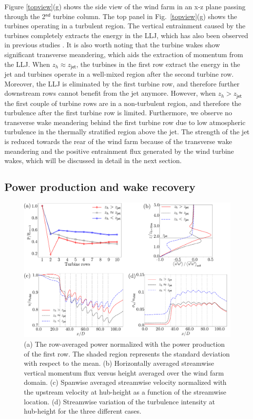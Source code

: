 \documentclass[%
 aip,
 amsmath,amssymb,
preprint,%
author-numerical,%
]{revtex4-1}
\begin{document}
Figure \ref{topview}(g) shows the side view of the wind farm in an x-z plane passing through the 2$^\mathsf{nd}$ turbine column. The top panel in Fig.\ \ref{topview}(g) shows the turbines operating in a turbulent region. The vertical entrainment caused by the turbines completely extracts the energy in the LLJ, which has also been observed in previous studies \cite{na18, lu11}. It is also worth noting that the turbine wakes show significant transverse meandering, which aids the extraction of momentum from the LLJ. When $z_h \approx z_\mathsf{jet}$, the turbines in the first row extract the energy in the jet and turbines operate in a well-mixed region after the second turbine row. Moreover, the LLJ is eliminated by the first turbine row, and therefore further downstream rows cannot benefit from the jet anymore. However, when $z_h > z_\mathsf{jet}$ the first couple of turbine rows are in a non-turbulent region, and therefore the turbulence after the first turbine row is limited. Furthermore, we observe no transverse wake meandering behind the first turbine row due to low atmospheric turbulence in the thermally stratified region above the jet. The strength of the jet is reduced towards the rear of the wind farm because of the transverse wake meandering and the positive entrainment flux generated by the wind turbine wakes, which will be discussed in detail in the next section.

\subsection{Power production and wake recovery}\label{sec3.2}
\begin{figure}
 \centering
 \includegraphics[width=0.9\linewidth]{powerplot} 
 \vspace{-0.25cm}
 \caption{(a) The row-averaged power normalized with the power production of the first row. The shaded region represents the standard deviation with respect to the mean. (b) Horizontally averaged streamwise vertical momentum flux versus height averaged over the wind farm domain. (c) Spanwise averaged streamwise velocity normalized with the upstream velocity at hub-height as a function of the streamwise location. (d) Streamwise variation of the turbulence intensity at hub-height for the three different cases.}
 \label{powerplots}
\end{figure}
\end{document}

